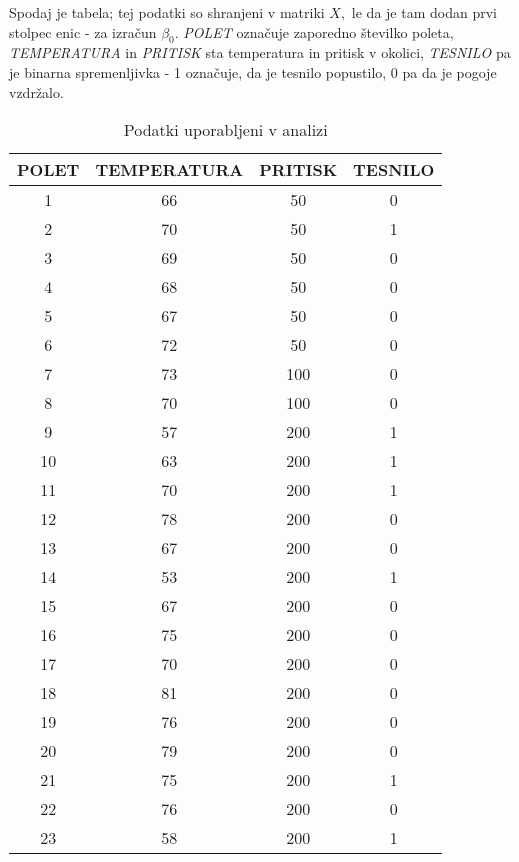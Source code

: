\documentclass[12pt,a4paper]{amsart}
\theoremstyle{definition} %
\theoremstyle{plain} %
\begin{document}
Spodaj je tabela; tej podatki so shranjeni v matriki $X,$ le da je tam dodan prvi stolpec enic - za izračun $\beta_{0}.$
\textit{POLET} označuje zaporedno številko poleta, \textit{TEMPERATURA} in \textit{PRITISK} sta temperatura in pritisk v okolici, \textit{TESNILO} pa je binarna
spremenljivka - 1 označuje, da je tesnilo popustilo, 0 pa da je pogoje vzdržalo.
\begin{center}
\begin{table}[H]
    \begin{tabular}{| c | c | c | c |}
        \hline
        POLET & TEMPERATURA & PRITISK & TESNILO \\
        \hline
        1&66&50&0\\
        2&70&50&1\\
        3&69&50&0\\
        4&68&50&0\\
        5&67&50&0\\
        6&72&50&0\\
        7&73&100&0\\
        8&70&100&0\\
        9&57&200&1\\
        10&63&200&1\\
        11&70&200&1\\
        12&78&200&0\\
        13&67&200&0\\
        14&53&200&1\\
        15&67&200&0\\
        16&75&200&0\\
        17&70&200&0\\
        18&81&200&0\\
        19&76&200&0\\
        20&79&200&0\\
        21&75&200&1\\
        22&76&200&0\\
        23&58&200&1\\
        \hline
\end{tabular}
\caption{\label{podatki} Podatki uporabljeni v analizi}
\end{table}
\end{center}
\end{document}
